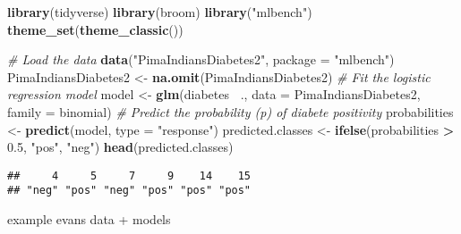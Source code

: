 \documentclass[
]{article}
\newenvironment{Shaded}{\begin{snugshade}}{\end{snugshade}}
\newcommand{\CommentTok}[1]{\textcolor[rgb]{0.56,0.35,0.01}{\textit{#1}}}
\newcommand{\DataTypeTok}[1]{\textcolor[rgb]{0.13,0.29,0.53}{#1}}
\newcommand{\FloatTok}[1]{\textcolor[rgb]{0.00,0.00,0.81}{#1}}
\newcommand{\KeywordTok}[1]{\textcolor[rgb]{0.13,0.29,0.53}{\textbf{#1}}}
\newcommand{\NormalTok}[1]{#1}
\newcommand{\OperatorTok}[1]{\textcolor[rgb]{0.81,0.36,0.00}{\textbf{#1}}}
\newcommand{\StringTok}[1]{\textcolor[rgb]{0.31,0.60,0.02}{#1}}
\begin{document}
\begin{Shaded}
\begin{Highlighting}[]
\KeywordTok{library}\NormalTok{(tidyverse)}
\KeywordTok{library}\NormalTok{(broom)}
\KeywordTok{library}\NormalTok{(}\StringTok{"mlbench"}\NormalTok{)}
\KeywordTok{theme_set}\NormalTok{(}\KeywordTok{theme_classic}\NormalTok{())}

\CommentTok{# Load the data}
\KeywordTok{data}\NormalTok{(}\StringTok{"PimaIndiansDiabetes2"}\NormalTok{, }\DataTypeTok{package =} \StringTok{"mlbench"}\NormalTok{)}
\NormalTok{PimaIndiansDiabetes2 <-}\StringTok{ }\KeywordTok{na.omit}\NormalTok{(PimaIndiansDiabetes2)}
\CommentTok{# Fit the logistic regression model}
\NormalTok{model <-}\StringTok{ }\KeywordTok{glm}\NormalTok{(diabetes }\OperatorTok{~}\NormalTok{., }\DataTypeTok{data =}\NormalTok{ PimaIndiansDiabetes2, }
               \DataTypeTok{family =}\NormalTok{ binomial)}
\CommentTok{# Predict the probability (p) of diabete positivity}
\NormalTok{probabilities <-}\StringTok{ }\KeywordTok{predict}\NormalTok{(model, }\DataTypeTok{type =} \StringTok{"response"}\NormalTok{)}
\NormalTok{predicted.classes <-}\StringTok{ }\KeywordTok{ifelse}\NormalTok{(probabilities }\OperatorTok{>}\StringTok{ }\FloatTok{0.5}\NormalTok{, }\StringTok{"pos"}\NormalTok{, }\StringTok{"neg"}\NormalTok{)}
\KeywordTok{head}\NormalTok{(predicted.classes)}
\end{Highlighting}
\end{Shaded}

\begin{verbatim}
##     4     5     7     9    14    15 
## "neg" "pos" "neg" "pos" "pos" "pos"
\end{verbatim}

example evans data + models
\end{document}
